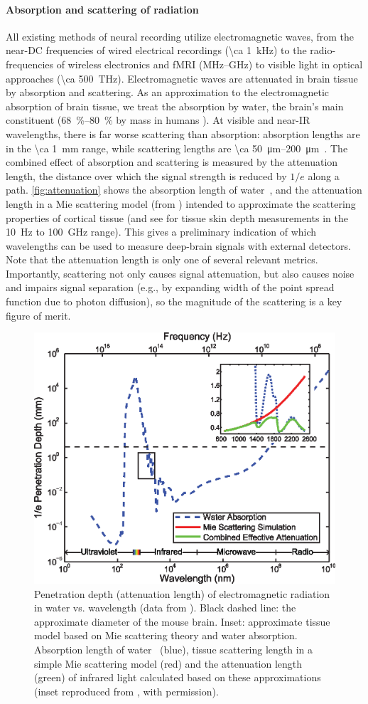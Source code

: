\paragraph{Absorption and scattering of radiation}
All existing methods of neural recording utilize electromagnetic waves, from the near-DC frequencies of wired electrical recordings (\SI{\ca 1}{\kilo\hertz}) to the radio-frequencies of wireless electronics and fMRI (MHz--GHz) to visible light in optical approaches (\SI{\ca 500}{\tera\hertz}).
Electromagnetic waves are attenuated in brain tissue by absorption and scattering.
As an approximation to the electromagnetic absorption of brain tissue, we treat the absorption by water, the brain's main constituent (\SIrange{68}{80}{\percent} by mass in humans \cite{dobbing73,fatouros99}).
At visible and near-IR wavelengths, there is far worse scattering than absorption: absorption lengths are in the \SI{\ca 1}{\milli\meter} range, while scattering lengths are \SIrange{\ca 50}{200}{\micro\meter}~\cite{Wilt2009}.
The combined effect of absorption and scattering is measured by the attenuation length, the distance over which the signal strength is reduced by $1/e$ along a path.
\autoref{fig:attenuation} shows the absorption length of water~\cite{kou93}, and the attenuation length in a Mie scattering model (from \cite{horton13}) intended to approximate the scattering properties of cortical tissue (and see \cite{gabriel1996} for tissue skin depth measurements in the \SI{10}{\hertz} to \SI{100}{\giga\hertz} range).
This gives a preliminary indication of which wavelengths can be used to measure deep-brain signals with external detectors. Note that the attenuation length is only one of several relevant metrics. Importantly, scattering not only causes signal attenuation, but also causes noise and impairs signal separation (e.g., by expanding width of the point spread function due to photon diffusion), so the magnitude of the scattering is a key figure of merit.

\begin{figure}[htbp]
\caption{%
Penetration depth (attenuation length) of electromagnetic radiation in water vs. wavelength (data from \cite{jonasz07}).
Black dashed line: the approximate diameter of the mouse brain.
Inset: approximate tissue model based on Mie scattering theory and water absorption. Absorption length of water~\cite{kou93} (blue), tissue scattering length in a simple Mie scattering model (red) and the attenuation length (green) of infrared light calculated based on these approximations (inset reproduced from \cite{kou93}, with permission).}
\label{fig:attenuation}
\centering
\includegraphics[width=0.5\linewidth]{figs/Fig2.eps}
\end{figure}

